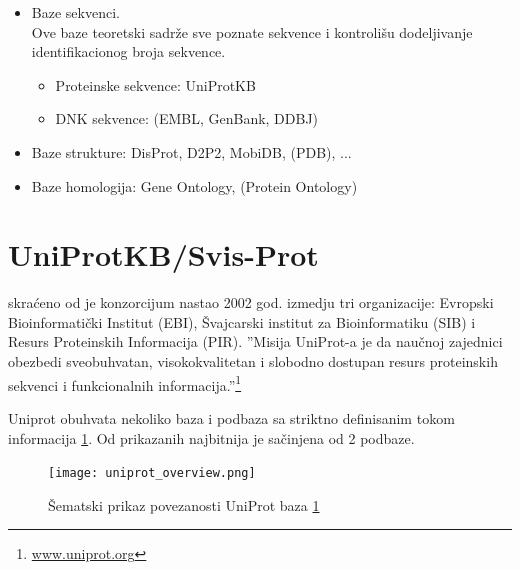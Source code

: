 \begin{itemize}
  \item Baze sekvenci.\\ 
        Ove baze teoretski sadrže sve poznate sekvence i kontrolišu dodeljivanje 
        identifikacionog broja sekvence.
    \begin{itemize}
      \item Proteinske sekvence: UniProtKB
      \item DNK sekvence: (EMBL, GenBank, DDBJ)
    \end{itemize}
  \item Baze strukture: DisProt, D2P2, MobiDB, (PDB), ...
  \item Baze homologija: Gene Ontology, (Protein Ontology)
\end{itemize}


\section{UniProtKB/Svis-Prot}

 skraćeno od  je konzorcijum
nastao 2002 god. izmedju tri organizacije: Evropski Bioinformatički
Institut (EBI), Švajcarski institut za Bioinformatiku (SIB) i Resurs
Proteinskih Informacija (PIR).  ''Misija UniProt-a je da naučnoj zajednici
obezbedi sveobuhvatan, visokokvalitetan i slobodno dostupan resurs proteinskih
sekvenci i funkcionalnih informacija.''\footnote{\url{www.uniprot.org}} 


Uniprot obuhvata nekoliko baza i podbaza sa striktno definisanim tokom
informacija \ref{fig:uniprot_overview}. Od prikazanih najbitnija je
  sačinjena od 2 podbaze.

\begin{figure}[h!]
  \centering
  \texttt{[image: uniprot\_overview.png]}
  \caption{Šematski prikaz povezanosti UniProt baza \ref{}}
  \label{fig:uniprot_overview}
\end{figure}

